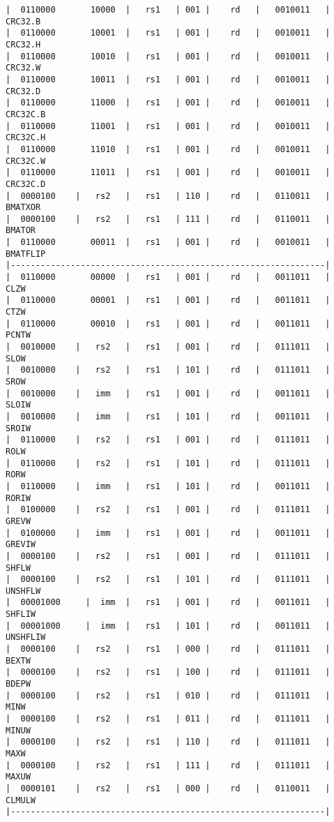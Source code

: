 \begin{verbatim}
|  0110000       10000  |   rs1   | 001 |    rd   |   0010011   |  CRC32.B
|  0110000       10001  |   rs1   | 001 |    rd   |   0010011   |  CRC32.H
|  0110000       10010  |   rs1   | 001 |    rd   |   0010011   |  CRC32.W
|  0110000       10011  |   rs1   | 001 |    rd   |   0010011   |  CRC32.D
|  0110000       11000  |   rs1   | 001 |    rd   |   0010011   |  CRC32C.B
|  0110000       11001  |   rs1   | 001 |    rd   |   0010011   |  CRC32C.H
|  0110000       11010  |   rs1   | 001 |    rd   |   0010011   |  CRC32C.W
|  0110000       11011  |   rs1   | 001 |    rd   |   0010011   |  CRC32C.D
|  0000100    |   rs2   |   rs1   | 110 |    rd   |   0110011   |  BMATXOR
|  0000100    |   rs2   |   rs1   | 111 |    rd   |   0110011   |  BMATOR
|  0110000       00011  |   rs1   | 001 |    rd   |   0010011   |  BMATFLIP
|---------------------------------------------------------------|
|  0110000       00000  |   rs1   | 001 |    rd   |   0011011   |  CLZW
|  0110000       00001  |   rs1   | 001 |    rd   |   0011011   |  CTZW
|  0110000       00010  |   rs1   | 001 |    rd   |   0011011   |  PCNTW
|  0010000    |   rs2   |   rs1   | 001 |    rd   |   0111011   |  SLOW
|  0010000    |   rs2   |   rs1   | 101 |    rd   |   0111011   |  SROW
|  0010000    |   imm   |   rs1   | 001 |    rd   |   0011011   |  SLOIW
|  0010000    |   imm   |   rs1   | 101 |    rd   |   0011011   |  SROIW
|  0110000    |   rs2   |   rs1   | 001 |    rd   |   0111011   |  ROLW
|  0110000    |   rs2   |   rs1   | 101 |    rd   |   0111011   |  RORW
|  0110000    |   imm   |   rs1   | 101 |    rd   |   0011011   |  RORIW
|  0100000    |   rs2   |   rs1   | 001 |    rd   |   0111011   |  GREVW
|  0100000    |   imm   |   rs1   | 001 |    rd   |   0011011   |  GREVIW
|  0000100    |   rs2   |   rs1   | 001 |    rd   |   0111011   |  SHFLW
|  0000100    |   rs2   |   rs1   | 101 |    rd   |   0111011   |  UNSHFLW
|  00001000     |  imm  |   rs1   | 001 |    rd   |   0011011   |  SHFLIW
|  00001000     |  imm  |   rs1   | 101 |    rd   |   0011011   |  UNSHFLIW
|  0000100    |   rs2   |   rs1   | 000 |    rd   |   0111011   |  BEXTW
|  0000100    |   rs2   |   rs1   | 100 |    rd   |   0111011   |  BDEPW
|  0000100    |   rs2   |   rs1   | 010 |    rd   |   0111011   |  MINW
|  0000100    |   rs2   |   rs1   | 011 |    rd   |   0111011   |  MINUW
|  0000100    |   rs2   |   rs1   | 110 |    rd   |   0111011   |  MAXW
|  0000100    |   rs2   |   rs1   | 111 |    rd   |   0111011   |  MAXUW
|  0000101    |   rs2   |   rs1   | 000 |    rd   |   0110011   |  CLMULW
|---------------------------------------------------------------|
\end{verbatim}

